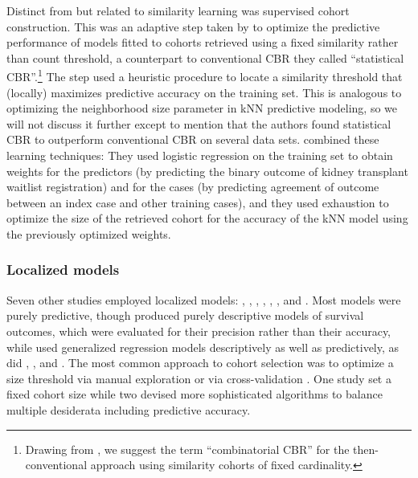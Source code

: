 \documentclass[sn-mathphys,Numbered,pdflatex]{sn-jnl}
\theoremstyle{remark}
\theoremstyle{definition}
\newcommand{\hl}[1]{#1}
\begin{document}
Distinct from but related to similarity learning was supervised cohort
construction. This was an adaptive step taken by \citet{Park2006} to
optimize the predictive performance of models fitted to cohorts
retrieved using a fixed similarity rather than count threshold, a
counterpart to conventional CBR they called ``statistical
CBR''.\footnote{Drawing from \citet{Goyal2008}, we suggest the term
  ``combinatorial CBR'' for the then-conventional approach using
  similarity cohorts of fixed cardinality.} The step used a heuristic
procedure to locate a similarity threshold that (locally) maximizes
predictive accuracy on the training set. This is analogous to optimizing
the neighborhood size parameter in \hl{kNN} predictive modeling, so we
will not discuss it further except to mention that the authors found
statistical CBR to outperform conventional CBR on several data sets.
\citet{CampilloGimenez2013} combined these learning techniques: They
used logistic regression on the training set to obtain weights for the
predictors (by predicting the binary outcome of kidney transplant
waitlist registration) and for the cases (by predicting agreement of
outcome between an index case and other training cases), and they used
exhaustion to optimize the size of the retrieved cohort for the accuracy
of the \hl{kNN} model using the previously optimized weights.

\subsubsection{Localized models}\label{localized-models}

\hl{Seven} other studies employed localized models:
\citet{Mariuzzi1997}, \citet{Lee2015}, \citet{Verma2015},
\citet{Wang2019}, \citet{Ma2020}, \citet{Liu2022}, and
\citet{Doborjeh2022}. \hl{Most} models were purely
predictive\hl{, though} \citet{Mariuzzi1997} produced purely descriptive
models of survival outcomes, which were evaluated for their precision
rather than their accuracy, while \citet{Ng2015} used generalized
regression models descriptively as well as predictively, as did
\citet{Tang2021}, \citet{Ng2021}, and \citet{Liu2022}\hl{.} The most
common approach to cohort selection was to optimize a size threshold via
manual exploration
\citep{Mariuzzi1997, Lee2015, Ng2015, Lee2017, Wang2019, Vilhena2016} or
via cross-validation \citep{Lowsky2013, Verma2015}. \hl{One} study
\citep{Ma2020} set a fixed cohort size while two
\citep{Liang2015, Tang2021, Ng2021} devised more sophisticated
algorithms to balance multiple desiderata including predictive accuracy.
\end{document}
